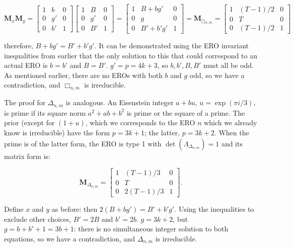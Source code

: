 \documentclass[12pt]{amsart}%
\begin{document}
\begin{equation}
   \mathbf{M}_x \mathbf{M}_y = \begin{bmatrix}
   1 & b & 0 \\
   0 & g' & 0 \\
   0 & b' & 1 \end{bmatrix} \begin{bmatrix}
   1 & B & 0 \\
   0 & g' & 0 \\
   0 & B' & 1 \end{bmatrix}
   = \begin{bmatrix}
   1 & B+bg' & 0 \\
   0 & g & 0 \\
   0 & B'+b'g' & 1 \end{bmatrix}
   = \mathbf{M}_{\Box_{n,m}} = \begin{bmatrix}
   1 & (T-1)/2 & 0 \\
   0 & T & 0 \\
   0 & (T-1)/2 & 1 \end{bmatrix}
\end{equation}

therefore, $B+bg' = B'+b'g'$. It can be demonstrated using the ERO
invariant inequalities from earlier that the only solution to this that could
correspond to an actual ERO is $b=b'$ and $B=B'$.
$g' = p = 4k + 3$, so $b, b', B, B'$ must all be odd. As mentioned
earlier, there are no EROs with both $b$ and $g$ odd, so we have a
contradiction, and $\Box_{n,m}$ is irreducible.

The proof for $\Delta_{n,m}$ is analogous. An Eisenstein integer
$a + bu$, $u=\exp(\pi i/3)$, is prime if its square norm
$a^2 + ab + b^2$ is prime or the square of a prime. The prior (except
for $(1 + u)$, which we corresponds to the ERO $n$ which we already
know is irreducible) have the form $p=3k+1$; the latter, $p=3k+2$.
When the prime is of the latter form, the ERO is type 1 with
$\det(\Lambda_{\Delta_{n,m}}) = 1$ and its matrix form is:

\begin{equation}
   \mathbf{M}_{\Delta_{n,m}} = \begin{bmatrix}
          1 & (T-1)/3 & 0 \\
          0 & T & 0 \\
          0 & 2(T-1)/3 & 1 \end{bmatrix}.
\end{equation}

Define $x$ and $y$ as before: then $2(B+bg') = B'+b'g'$. Using the
inequalities to exclude other choices, $B' = 2B$ and $b' = 2b$.
$g = 3k + 2$, but $g = b+ b' + 1 = 3b+1$:
there is no simultaneous integer solution to both equations,
so we have a contradiction, and $\Delta_{n,m}$ is irreducible.
\end{document}

